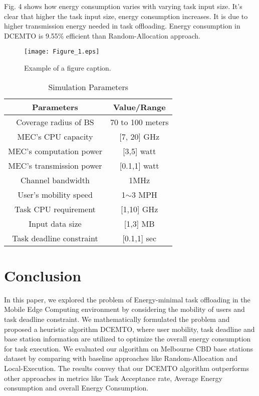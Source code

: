 \documentclass[conference]{IEEEtran}
\begin{document}
	Fig. 4 shows how energy consumption varies with varying task input size. It’s clear that higher the task input size, energy consumption increases. It is due to higher transmission energy needed in task offloading. Energy consumption in DCEMTO is 9.55\% efficient than Random-Allocation approach.

 \begin{figure}[htbp]
\centerline{\texttt{[image: Figure\_1.eps]}}
\caption{Example of a figure caption.}
\label{fig}
\end{figure}


 \begin{table}[htbp]
\caption{Simulation Parameters}
\begin{center}
\begin{tabular}{|c|c|}
\hline
\textbf{Parameters}&\textbf{Value/Range}\\
\hline
Coverage radius of BS & 70 to 100 meters  \\
\hline
MEC’s CPU capacity & [7, 20] GHz \\
\hline
MEC’s computation power  & [3,5] watt \\
\hline
MEC’s transmission power & [0.1,1] watt \\
\hline
Channel bandwidth & 1MHz \\
\hline
User’s mobility speed & 1$\mathrm{\sim}$3 MPH \\
\hline
Task CPU requirement & [1,10] GHz \\
\hline
Input data size & [1,3] MB \\
\hline
Task deadline constraint & [0.1,1] sec \\
\hline
\end{tabular}
\label{tab1}
\end{center}
\end{table}
 

\section{Conclusion}
In this paper, we explored the problem of Energy-minimal task offloading in the Mobile Edge Computing environment by considering the mobility of users and task deadline constraint. We mathematically formulated the problem and proposed a heuristic algorithm DCEMTO, where user mobility, task deadline and base station information are utilized to optimize the overall energy consumption for task execution. We evaluated our algorithm on Melbourne CBD base stations dataset by comparing with baseline approaches like Random-Allocation and Local-Execution. The results convey that our DCEMTO algorithm outperforms other approaches in metrics like Task Acceptance rate, Average Energy consumption and overall Energy Consumption.
\end{document}
